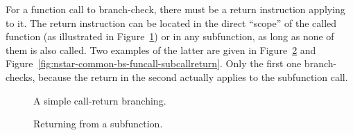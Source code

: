 For a function call to branch-check, there must be a return instruction applying to it.
The return instruction can be located in the direct ``scope'' of the called function (as illustrated in Figure~\ref{fig:nstar-common-bs-funcall-simplereturn}) or in any subfunction, as long as none of them is also called.
Two examples of the latter are given in Figure~\ref{fig:nstar-common-bs-funcall-subreturn} and Figure~\ref{fig:nstar-common-bs-funcall-subcallreturn}.
Only the first one branch-checks, because the return in the second actually applies to the subfunction call.

\begin{figure}[htb]
  \centering


  \caption{A simple call-return branching.}
  \label{fig:nstar-common-bs-funcall-simplereturn}
\end{figure}
\begin{figure}[htb]
  \centering


  \caption{Returning from a subfunction.}
  \label{fig:nstar-common-bs-funcall-subreturn}
\end{figure}
